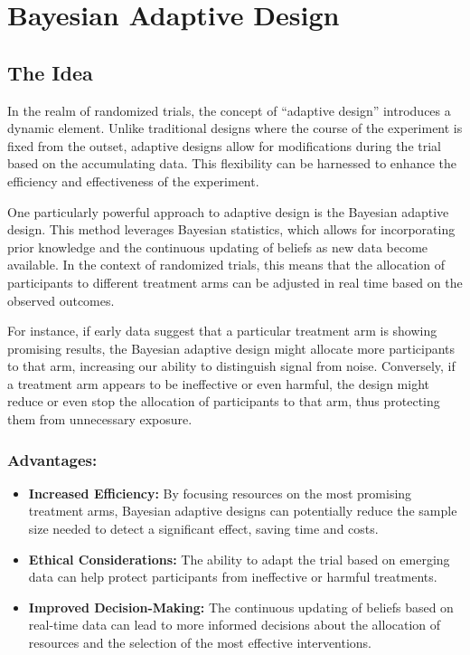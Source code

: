 \documentclass[
  letterpaper,
  DIV=11,
  numbers=noendperiod]{scrreprt}
\begin{document}
\chapter{Bayesian Adaptive Design}\label{bayesian-adaptive-design}

\section{The Idea}\label{the-idea}

In the realm of randomized trials, the concept of ``adaptive design''
introduces a dynamic element. Unlike traditional designs where the
course of the experiment is fixed from the outset, adaptive designs
allow for modifications during the trial based on the accumulating data.
This flexibility can be harnessed to enhance the efficiency and
effectiveness of the experiment.

One particularly powerful approach to adaptive design is the Bayesian
adaptive design. This method leverages Bayesian statistics, which allows
for incorporating prior knowledge and the continuous updating of beliefs
as new data become available. In the context of randomized trials, this
means that the allocation of participants to different treatment arms
can be adjusted in real time based on the observed outcomes.

For instance, if early data suggest that a particular treatment arm is
showing promising results, the Bayesian adaptive design might allocate
more participants to that arm, increasing our ability to distinguish
signal from noise. Conversely, if a treatment arm appears to be
ineffective or even harmful, the design might reduce or even stop the
allocation of participants to that arm, thus protecting them from
unnecessary exposure.

\subsection*{Advantages:}\label{advantages-1}

\begin{itemize}
\item
  \textbf{Increased Efficiency:} By focusing resources on the most
  promising treatment arms, Bayesian adaptive designs can potentially
  reduce the sample size needed to detect a significant effect, saving
  time and costs.
\item
  \textbf{Ethical Considerations:} The ability to adapt the trial based
  on emerging data can help protect participants from ineffective or
  harmful treatments.
\item
  \textbf{Improved Decision-Making:} The continuous updating of beliefs
  based on real-time data can lead to more informed decisions about the
  allocation of resources and the selection of the most effective
  interventions.
\end{itemize}
\end{document}
